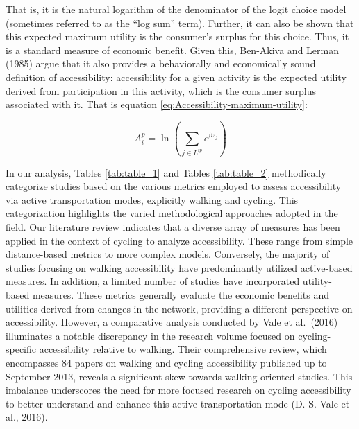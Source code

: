 \documentclass[
11pt, %
oneside, %
english, %
singlespacing, %
]{macthesis} %
\begin{document}
That is, it is the natural logarithm of the denominator of the logit choice model (sometimes referred to as the ``log sum'' term). Further, it can also be shown that this expected maximum utility is the consumer's surplus for this choice. Thus, it is a standard measure of economic benefit. Given this, Ben-Akiva and Lerman (1985) argue that it also provides a behaviorally and economically sound definition of accessibility: accessibility for a given activity is the expected utility derived from participation in this activity, which is the consumer surplus associated with it. That is equation \eqref{eq:Accessibility-maximum-utility}:

\begin{equation}
A^{p}_i = \ln \left(\sum_{j \in L^{ip}} e^{\beta z_j} \right)
\label{eq:Accessibility-maximum-utility}
\end{equation}

In our analysis, Tables \ref{tab:table_1} and Tables \ref{tab:table_2} methodically categorize studies based on the various metrics employed to assess accessibility via active transportation modes, explicitly walking and cycling. This categorization highlights the varied methodological approaches adopted in the field. Our literature review indicates that a diverse array of measures has been applied in the context of cycling to analyze accessibility. These range from simple distance-based metrics to more complex models. Conversely, the majority of studies focusing on walking accessibility have predominantly utilized active-based measures. In addition, a limited number of studies have incorporated utility-based measures. These metrics generally evaluate the economic benefits and utilities derived from changes in the network, providing a different perspective on accessibility. However, a comparative analysis conducted by Vale et al.~(2016) illuminates a notable discrepancy in the research volume focused on cycling-specific accessibility relative to walking. Their comprehensive review, which encompasses 84 papers on walking and cycling accessibility published up to September 2013, reveals a significant skew towards walking-oriented studies. This imbalance underscores the need for more focused research on cycling accessibility to better understand and enhance this active transportation mode (D. S. Vale et al., 2016).
\end{document}
